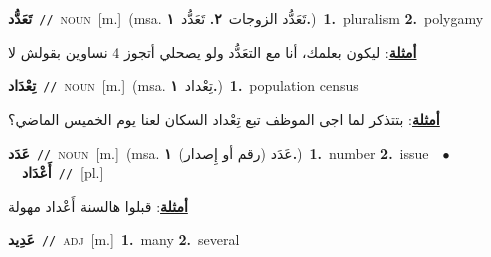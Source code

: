 \documentclass[10pt,a4paper,twoside]{article} %
\begin{document}
\begin{multicols}{2}
{\setlength\topsep{0pt}\textbf{\foreignlanguage{arabic}{تَعَدُّد}}\ {\color{gray}\texttt{//}\color{black}}\ \textsc{noun}\ [m.]\ \color{gray}(msa. \foreignlanguage{arabic}{تَعَدُّد الزوجات}~\foreignlanguage{arabic}{\textbf{٢.}}  \foreignlanguage{arabic}{تَعَدُّد}~\foreignlanguage{arabic}{\textbf{١.}})\color{black}\ \textbf{1.}~pluralism  \textbf{2.}~polygamy\  \begin{flushright}\color{gray}\foreignlanguage{arabic}{\textbf{\underline{\foreignlanguage{arabic}{أمثلة}}}: ليكون بعلمك، أنا مع التعَدُّد ولو يصحلي أتجوز 4 نساوين بقولش لا}\end{flushright}\color{black}} \vspace{2mm}

{\setlength\topsep{0pt}\textbf{\foreignlanguage{arabic}{تِعْدَاد}}\ {\color{gray}\texttt{//}\color{black}}\ \textsc{noun}\ [m.]\ \color{gray}(msa. \foreignlanguage{arabic}{تِعْداد}~\foreignlanguage{arabic}{\textbf{١.}})\color{black}\ \textbf{1.}~population census\  \begin{flushright}\color{gray}\foreignlanguage{arabic}{\textbf{\underline{\foreignlanguage{arabic}{أمثلة}}}: بتتذكر لما اجى الموظف تبع تِعْداد السكان لعنا يوم الخميس الماضي؟}\end{flushright}\color{black}} \vspace{2mm}

{\setlength\topsep{0pt}\textbf{\foreignlanguage{arabic}{عَدَد}}\ {\color{gray}\texttt{//}\color{black}}\ \textsc{noun}\ [m.]\ \color{gray}(msa. \foreignlanguage{arabic}{عَدَد (رقم أو إِصدار)}~\foreignlanguage{arabic}{\textbf{١.}})\color{black}\ \textbf{1.}~number  \textbf{2.}~issue\ \ $\bullet$\ \ \setlength\topsep{0pt}\textbf{\foreignlanguage{arabic}{أَعْدَاد}}\ {\color{gray}\texttt{//}\color{black}}\ [pl.]\  \begin{flushright}\color{gray}\foreignlanguage{arabic}{\textbf{\underline{\foreignlanguage{arabic}{أمثلة}}}: قبلوا هالسنة أَعْداد مهولة}\end{flushright}\color{black}} \vspace{2mm}

{\setlength\topsep{0pt}\textbf{\foreignlanguage{arabic}{عَدِيد}}\ {\color{gray}\texttt{//}\color{black}}\ \textsc{adj}\ [m.]\ \textbf{1.}~many  \textbf{2.}~several\ } \vspace{2mm}


\end{multicols}
\end{document}
